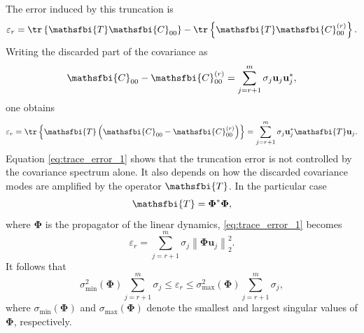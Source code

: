 \begin{appendices}
The error induced by this truncation is
\begin{equation}
  \varepsilon_r
  =
  \tr
  \left\{
    \mathsfbi{T}\mathsfbi{C}_{00}
  \right\}
  -
  \tr
  \left\{
    \mathsfbi{T}\mathsfbi{C}_{00}^{(r)}
  \right\}.
  \label{eq:covariance_truncation_error_definition}
\end{equation}
Writing the discarded part of the covariance as
\begin{equation}
  \mathsfbi{C}_{00}
  -
  \mathsfbi{C}_{00}^{(r)}
  =
  \sum_{j=r+1}^{m}
  \sigma_j\mathbf{u}_j\mathbf{u}_j^{*},
  \label{eq:covariance_discarded_tail}
\end{equation}
one obtains
\begin{equation}
  \varepsilon_r
  =
  \tr
  \left\{
    \mathsfbi{T}
    \left(
      \mathsfbi{C}_{00}
      -
      \mathsfbi{C}_{00}^{(r)}
    \right)
  \right\}
  =
  \sum_{j=r+1}^{m}
  \sigma_j
  \mathbf{u}_j^{*}\mathsfbi{T}\mathbf{u}_j .
  \label{eq:trace_error_1}
\end{equation}
Equation \eqref{eq:trace_error_1} shows that the truncation error is not controlled by the covariance spectrum alone. It also depends on how the discarded covariance modes are amplified by the operator \(\mathsfbi{T}\). In the particular case
\begin{equation}
  \mathsfbi{T}
  =
  \boldsymbol{\Phi}^{*}\boldsymbol{\Phi},
  \label{eq:T_phi_phi_sste_necessity}
\end{equation}
where \(\boldsymbol{\Phi}\) is the propagator of the linear dynamics, \eqref{eq:trace_error_1} becomes
\begin{equation}
  \varepsilon_r
  =
  \sum_{j=r+1}^{m}
  \sigma_j
  \left\|
    \boldsymbol{\Phi}\mathbf{u}_j
  \right\|_2^2 .
  \label{eq:trace_error_phi_tail}
\end{equation}
It follows that
\begin{equation}
  \sigma_{\min}^{2}
  \left(
    \boldsymbol{\Phi}
  \right)
  \sum_{j=r+1}^{m}\sigma_j
  \le
  \varepsilon_r
  \le
  \sigma_{\max}^{2}
  \left(
    \boldsymbol{\Phi}
  \right)
  \sum_{j=r+1}^{m}\sigma_j,
  \label{eq:trace_error_bound}
\end{equation}
where \(\sigma_{\min}(\boldsymbol{\Phi})\) and \(\sigma_{\max}(\boldsymbol{\Phi})\) denote the smallest and largest singular values of \(\boldsymbol{\Phi}\), respectively.


\end{appendices}

